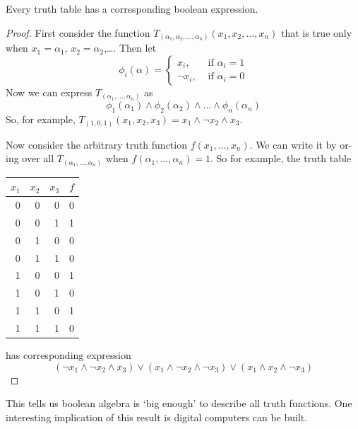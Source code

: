 \documentclass{scrbook}
\begin{document}
\begin{theorem}[completeness]
  Every truth table has a corresponding boolean expression.
\end{theorem}
\begin{proof}
  First consider the function $T_{(\alpha_1,\alpha_2,\dots, \alpha_n)} (x_1,x_2,\dots, x_n)$ that is true only when $x_1 = \alpha_1$, $x_2=\alpha_2$,\dots. Then let
  \[
  \phi_i(\alpha)=
  \begin{cases}
    x_i,&\textrm{ if } \alpha_i=1 \\
    \neg x_i,&\textrm{ if }\alpha_i=0
  \end{cases}
  \]
  Now we can express $T_{(\alpha_1,\dots,\alpha_n)}$ as
  \[
  \phi_1(\alpha_1)\wedge \phi_2(\alpha_2)\wedge \dots \wedge \phi_n(\alpha_n)
  \]
  So, for example, $T_{(1,0,1)}(x_1,x_2,x_3)=x_1\wedge \neg x_2 \wedge x_3$. 

  Now consider the arbitrary truth function $f(x_1,\dots, x_n)$. We can write it by or-ing over all $T_{(\alpha_1,\dots, \alpha_n)}$ when $f(\alpha_1,\dots,\alpha_n)=1$. 
  So for example, the truth table
  \begin{center}
\begin{tabular}{rrrr}
$x_1$ & $x_2$ & $x_3$ & $f$ \\
\hline
0 & 0 & 0 & 0 \\
0 & 0 & 1 & 1 \\
0 & 1 & 0 & 0 \\
0 & 1 & 1 & 0 \\
1 & 0 & 0 & 1 \\
1 & 0 & 1 & 0 \\
1 & 1 & 0 & 1 \\
1 & 1 & 1 & 0 
\end{tabular}
  \end{center}
  has corresponding expression
  \[
  (\neg x_1 \wedge \neg x_2 \wedge x_3)\vee (x_1 \wedge \neg x_2 \wedge \neg x_3) \vee (x_1 \wedge x_2 \wedge \neg x_3)
  \]
\end{proof}
This tells us boolean algebra is `big enough' to describe all truth functions. One interesting implication of this result is digital computers can be built. 
\end{document}
